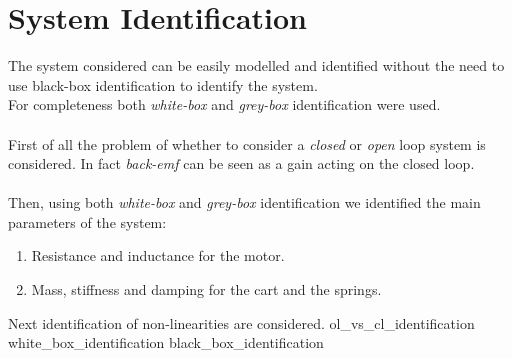 \chapter{System Identification}
The system considered can be easily modelled and identified without the need to use black-box identification to identify the system. \\ For completeness both \emph{white-box} and \emph{grey-box} identification were used.\\ \\
First of all the problem of whether to consider a \emph{closed} or \emph{open} loop system is considered. In fact \emph{back-emf} can be seen as a gain acting on the closed loop.\\ \\
Then, using both \emph{white-box} and \emph{grey-box} identification we identified the main parameters of the system: 
\begin{enumerate}
\item Resistance and inductance for the motor.
\item Mass, stiffness and damping for the cart and the springs.
\end{enumerate}
Next identification of non-linearities are considered.
{ol_vs_cl_identification}
\newpage
{white_box_identification}
{black_box_identification}